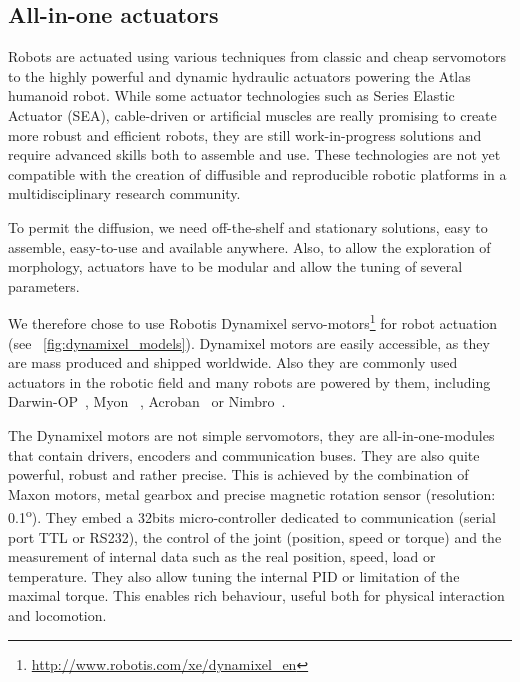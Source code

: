 \subsection{All-in-one actuators} %

Robots are actuated using various techniques from classic and cheap servomotors to the highly powerful and dynamic hydraulic actuators powering the Atlas humanoid robot.
While some actuator technologies such as Series Elastic Actuator (SEA), cable-driven or artificial muscles are really promising to create more robust and efficient robots, they are still work-in-progress solutions and require advanced skills both to assemble and use. These technologies are not yet compatible with the creation of diffusible and reproducible robotic platforms in a multidisciplinary research community.


To permit the diffusion, we need off-the-shelf and stationary solutions, easy to assemble, easy-to-use and available anywhere. Also, to allow the exploration of morphology, actuators have to be modular and allow the tuning of several parameters.

We therefore chose to use Robotis Dynamixel servo-motors\footnote{\url{http://www.robotis.com/xe/dynamixel_en}} for robot actuation (see \figurename~\ref{fig:dynamixel_models}). Dynamixel motors are easily accessible, as they are mass produced and shipped worldwide. Also they are commonly used actuators in the robotic field and many robots are powered by them, including Darwin-OP~\parencite{ha2011development}, Myon~\parencite{hild2012myon} , Acroban~\parencite{ly2011bio} or Nimbro~\parencite{schwarznimbro}.

The Dynamixel motors are not simple servomotors, they are all-in-one-modules that contain drivers, encoders and communication buses. They are also quite powerful, robust and rather precise. This is achieved by the combination of Maxon motors, metal gearbox and precise magnetic rotation sensor (resolution: 0.1\textsuperscript{o}). They embed a 32bits micro-controller dedicated to communication (serial port TTL or RS232), the control of the joint (position, speed or torque) and the measurement of internal data such as the real position, speed, load or temperature. They also allow tuning the internal PID or limitation of the maximal torque. This enables rich behaviour, useful both for physical interaction and locomotion.


